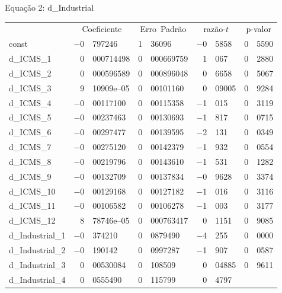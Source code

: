 \documentclass[11pt]{article}
\begin{document}
\begin{center}

Equação 2: d\_Industrial\\

\vspace{1em}

\begin{tabular}{lr@{,}lr@{,}lr@{,}lr@{,}l}
  &
 \multicolumn{2}{c}{Coeficiente} &
  \multicolumn{2}{c}{Erro\ Padrão} &
   \multicolumn{2}{c}{razão-$t$} &
    \multicolumn{2}{c}{p-valor} \\[1ex]
const &
  $-$0&797246 &
    1&36096 &
      $-$0&5858 &
        0&5590 \\
d\_ICMS\_1 &
  0&000714498 &
    0&000669759 &
      1&067 &
        0&2880 \\
d\_ICMS\_2 &
  0&000596589 &
    0&000896048 &
      0&6658 &
        0&5067 \\
d\_ICMS\_3 &
  9&10909\textrm{e--05} &
    0&00101160 &
      0&09005 &
        0&9284 \\
d\_ICMS\_4 &
  $-$0&00117100 &
    0&00115358 &
      $-$1&015 &
        0&3119 \\
d\_ICMS\_5 &
  $-$0&00237463 &
    0&00130693 &
      $-$1&817 &
        0&0715 \\
d\_ICMS\_6 &
  $-$0&00297477 &
    0&00139595 &
      $-$2&131 &
        0&0349 \\
d\_ICMS\_7 &
  $-$0&00275120 &
    0&00142379 &
      $-$1&932 &
        0&0554 \\
d\_ICMS\_8 &
  $-$0&00219796 &
    0&00143610 &
      $-$1&531 &
        0&1282 \\
d\_ICMS\_9 &
  $-$0&00132709 &
    0&00137834 &
      $-$0&9628 &
        0&3374 \\
d\_ICMS\_10 &
  $-$0&00129168 &
    0&00127182 &
      $-$1&016 &
        0&3116 \\
d\_ICMS\_11 &
  $-$0&00106582 &
    0&00106278 &
      $-$1&003 &
        0&3177 \\
d\_ICMS\_12 &
  8&78746\textrm{e--05} &
    0&000763417 &
      0&1151 &
        0&9085 \\
d\_Industrial\_1 &
  $-$0&374210 &
    0&0879490 &
      $-$4&255 &
        0&0000 \\
d\_Industrial\_2 &
  $-$0&190142 &
    0&0997287 &
      $-$1&907 &
        0&0587 \\
d\_Industrial\_3 &
  0&00530084 &
    0&108509 &
      0&04885 &
        0&9611 \\
d\_Industrial\_4 &
  0&0555490 &
    0&115799 &
      0&4797 &

\end{tabular}
\end{center}
\end{document}
